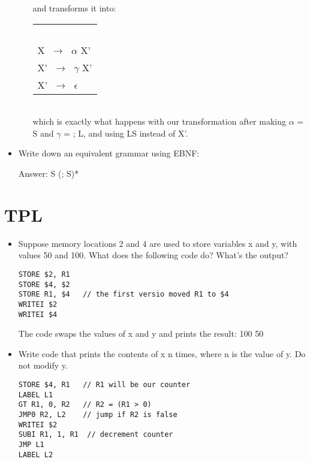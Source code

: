\documentclass{article}
\newcommand{\regla}[1]{$\;\mathbf{\stackrel{{}_{#1}}{\longrightarrow}}\;$}
\begin{document}
\begin{itemize}
\begin{itemize}
and transforms it into:

\begin{tabular}{l}
\ \\
X  \regla{}  $\alpha$ X' \\
X'  \regla{} $\gamma$ X' \\
X'  \regla{} $\epsilon$ \\
\end{tabular} \\

\noindent which is exactly what happens with our transformation after making $\alpha$ = S and $\gamma$ = ; L, and using LS instead of X'.

\end{itemize}


\item Write down an equivalent grammar using EBNF:

Answer: S (; S)*


\end{itemize}

\section{TPL}

\begin{itemize}

\item Suppose memory locations 2 and 4 are used to store variables x and y, with values 50 and 100.  What does the following code do? What’s the output?

\begin{verbatim}
STORE $2, R1
STORE $4, $2
STORE R1, $4   // the first versio moved R1 to $4
WRITEI $2
WRITEI $4
\end{verbatim}

The code swaps the values of x and y and prints the result: 100 50

\item Write code that prints the contents of x n times, where n is the value of y. Do not modify y.

\begin{verbatim}
STORE $4, R1   // R1 will be our counter
LABEL L1
GT R1, 0, R2   // R2 = (R1 > 0)
JMP0 R2, L2    // jump if R2 is false
WRITEI $2
SUBI R1, 1, R1  // decrement counter
JMP L1
LABEL L2

\end{verbatim}

\end{itemize}
\end{document}
